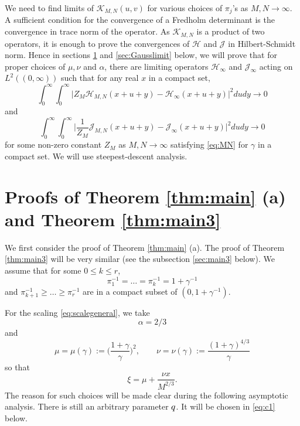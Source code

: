 \documentclass[11pt]{article}
\begin{document}
We need to find limits of $\mathcal{K}_{M,N}(u,v)$ for various
choices of $\pi_j$'s as $M,N\to\infty$. A sufficient condition for
the convergence of a Fredholm determinant is the convergence in
trace norm of the operator. As $\mathcal{K}_{M,N}$ is a product of
two operators, it is enough to prove the convergences of
$\mathcal{H}$ and $\mathcal{J}$ in Hilbert-Schmidt norm. Hence in
sections \ref{sec:Airylimit} and \ref{sec:Gausslimit} below, we
will prove that for proper choices of $\mu, \nu$ and $\alpha$,
there are limiting operators $\mathcal{H}_\infty$ and
$\mathcal{J}_\infty$ acting on $L^2((0,\infty))$ such that for any
real $x$ in a compact set,
\begin{equation}\label{eq:HS1}
  \int_0^\infty \int_0^\infty
  \bigl| Z_M \mathcal{H}_{M,N}(x+u+y)-\mathcal{H}_\infty(x+u+y) \bigr|^2 dudy
  \to 0
\end{equation}
and
\begin{equation}\label{eq:HS2}
  \int_0^\infty \int_0^\infty
  \bigl| \frac1{Z_M} \mathcal{J}_{M,N}(x+u+y)-\mathcal{J}_\infty(x+u+y) \bigr|^2 dudy
  \to 0
\end{equation}
for some non-zero constant $Z_M$ as $M, N \to\infty$ satisfying
\eqref{eq:MN} for $\gamma$ in a compact set. We will use
steepest-descent analysis.


\section{Proofs of Theorem \ref{thm:main} (a) and Theorem \ref{thm:main3}}
\label{sec:Airylimit}


We first consider the proof of Theorem \ref{thm:main} (a). The
proof of Theorem \ref{thm:main3} will be very similar (see the
subsection \ref{sec:main3} below).
We assume that for some $0\le k\le r$,
\begin{equation}
  \pi_1^{-1}=\dots= \pi_k^{-1}=1+\gamma^{-1}
\end{equation}
 and
$\pi_{k+1}^{-1}\ge\dots\ge \pi_{r}^{-1}$ are in a compact subset
of $(0, 1+\gamma^{-1})$.

For the scaling \eqref{eq:scalegeneral}, we take
\begin{equation}
\alpha=2/3
\end{equation}
and
\begin{equation}\label{eq:mu}
  \mu=\mu(\gamma) := \biggl(\frac{1+\gamma}{\gamma}\biggr)^2, \qquad
  \nu=\nu(\gamma) := \frac{(1+\gamma)^{4/3}}{\gamma}
\end{equation}
so that
\begin{equation}
  \xi= \mu+\frac{\nu x}{M^{2/3}}.
\end{equation}
The reason for such choices will be made clear during the
following asymptotic analysis. There is still an arbitrary
parameter $q$. It will be chosen in \eqref{eq:c1} below.
\end{document}
